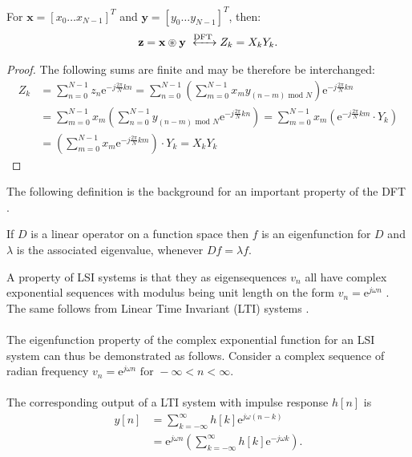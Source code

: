 \begin{theorem}
For $\textbf{x} = [x_0 \dots x_{N-1}]^T$ and $\textbf{y} = [y_0 \dots y_{N-1}]^T$, then:
\begin{align*}
\textbf{z} = \textbf{x} \circledast \textbf{y} \xleftrightarrow{\text{DFT}} Z_k = X_k Y_k.
\end{align*}
\end{theorem}

\begin{proof}
The following sums are finite and may be therefore be interchanged:
\begin{align*}
Z_k &= \sum_{n=0}^{N-1} z_n \text{e}^{-j\frac{2\pi}{N}kn} = \sum_{n=0}^{N-1} \left( \sum_{m=0}^{N-1} x_m y_{(n-m) \text{ mod } N} \right) \text{e}^{-j\frac{2\pi}{N}kn} \\
&= \sum_{m=0}^{N-1} x_m \left( \sum_{n=0}^{N-1} y_{(n-m) \text{ mod } N} \text{e}^{-j\frac{2\pi}{N}kn} \right) = \sum_{m=0}^{N-1} x_m \left( \text{e}^{-j\frac{2\pi}{N}km} \cdot Y_k \right) \\
&= \left( \sum_{m=0}^{N-1} x_m \text{e}^{-j\frac{2\pi}{N}km} \right) \cdot Y_k = X_k Y_k
\end{align*}
\end{proof}

The following definition is the background for an important property of the DFT \cite{Eigenfunctions}.

\begin{definition}[Eigenfunction]
If $D$ is a linear operator on a function space then $f$ is an eigenfunction for $D$ and $\lambda$ is the associated eigenvalue, whenever $Df = \lambda f$.
\end{definition}

A property of LSI systems is that they as eigensequences $v_n$ all have complex exponential sequences with modulus being unit length on the form $v_n = \text{e}^{j \omega n}$ \cite{FSP}.\\ The same follows from Linear Time Invariant (LTI) systems \cite{DTSP}.
\\\\
The eigenfunction property of the complex exponential function for an LSI system can thus be demonstrated as follows. Consider a complex sequence of radian frequency $v_n = \text{e}^{j\omega n} \text{ for } -\infty < n < \infty$.
\\\\
The corresponding output of a LTI system with impulse response $h[n]$ is
\begin{align*}
y[n] 
&= \sum_{k=-\infty}^{\infty} h[k]\text{e}^{j\omega(n-k)} \nonumber \\ 
&= \text{e}^{j\omega n} \left(\sum_{k=-\infty}^{\infty} h[k]\text{e}^{-j\omega k} \right).
\end{align*}

